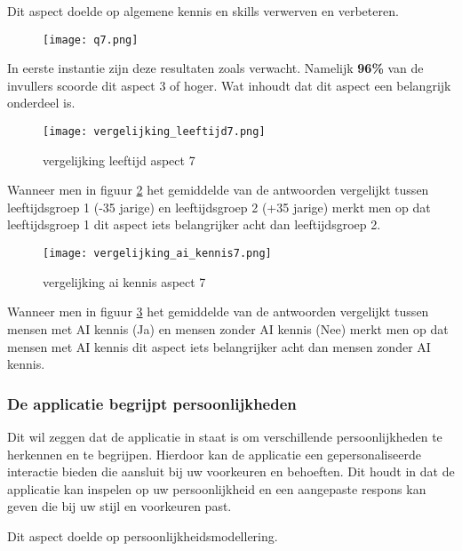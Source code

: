 Dit aspect doelde op algemene kennis en skills verwerven en verbeteren.

\begin{figure}[htbp]
    \centering
    \texttt{[image: q7.png]}
    \label{fig:vraag_7_resultaat}
\end{figure}

In eerste instantie zijn deze resultaten zoals verwacht. Namelijk \textbf{96\%} van de invullers scoorde dit aspect 3 of hoger. Wat inhoudt dat dit aspect een belangrijk onderdeel is.

\begin{figure}[htbp]
    \centering
    \texttt{[image: vergelijking\_leeftijd7.png]}
    \caption{vergelijking leeftijd aspect 7}
    \label{fig:vergelijking_leeftijd7}
\end{figure}

Wanneer men in figuur \ref{fig:vergelijking_leeftijd7} het gemiddelde van de antwoorden vergelijkt tussen leeftijdsgroep 1 (-35 jarige) en leeftijdsgroep 2 (+35 jarige) merkt men op dat leeftijdsgroep 1 dit aspect iets belangrijker acht dan leeftijdsgroep 2.

\begin{figure}[htbp]
    \centering
    \texttt{[image: vergelijking\_ai\_kennis7.png]}
    \caption{vergelijking ai kennis aspect 7}
    \label{fig:vergelijking_ai_kennis7}
\end{figure}

Wanneer men in figuur \ref{fig:vergelijking_ai_kennis7} het gemiddelde van de antwoorden vergelijkt tussen mensen met AI kennis (Ja) en mensen zonder AI kennis (Nee) merkt men op dat mensen met AI kennis dit aspect iets belangrijker acht dan mensen zonder AI kennis.

\newpage

\subsubsection{De applicatie begrijpt persoonlijkheden}

Dit wil zeggen dat de applicatie in staat is om verschillende persoonlijkheden te herkennen en te begrijpen. Hierdoor kan de applicatie een gepersonaliseerde interactie bieden die aansluit bij uw voorkeuren en behoeften. Dit houdt in dat de applicatie kan inspelen op uw persoonlijkheid en een aangepaste respons kan geven die bij uw stijl en voorkeuren past.

Dit aspect doelde op persoonlijkheidsmodellering.

